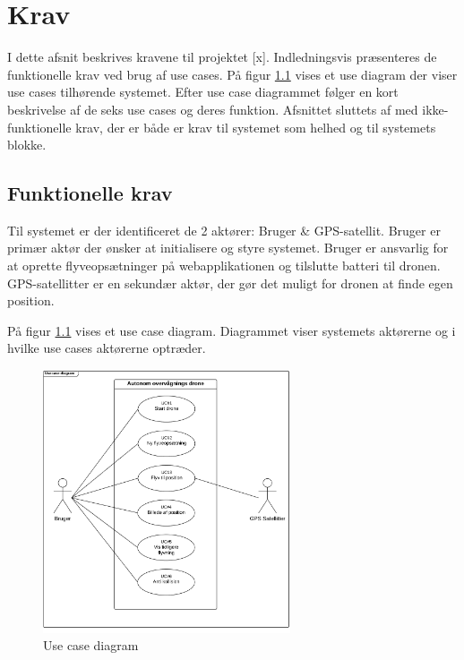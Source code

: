 \chapter{Krav}
\vspace{-0.5cm}
I dette afsnit beskrives kravene til projektet [x]. Indledningsvis præsenteres de funktionelle krav  ved brug af use cases. På figur \ref{fig:useCaseDiagram} vises et use diagram der viser use cases tilhørende systemet. Efter use case diagrammet følger en kort beskrivelse af de seks use cases og deres funktion. Afsnittet sluttets af med ikke-funktionelle krav, der er både er krav til systemet som helhed og til systemets blokke.
\vspace{-0.3cm}

\section{Funktionelle krav}
\vspace{-0.2cm}
Til systemet er der identificeret de 2 aktører: Bruger \& GPS-satellit. Bruger er primær aktør der ønsker at initialisere og styre systemet. Bruger er ansvarlig for at oprette flyveopsætninger på webapplikationen og tilslutte batteri til dronen.
GPS-satellitter er en sekundær aktør, der gør det muligt for dronen at finde egen position. 

På figur \ref{fig:useCaseDiagram} vises et use case diagram. Diagrammet viser systemets aktørerne og i hvilke use cases aktørerne optræder. 
\begin{figure}[H]
	\centering
	\includegraphics[width=0.65\textwidth]{Billeder/Krav/Use_case_diagram}
	\vspace{-0.3cm}	
	\caption{Use case diagram}
	\label{fig:useCaseDiagram}
\end{figure}

